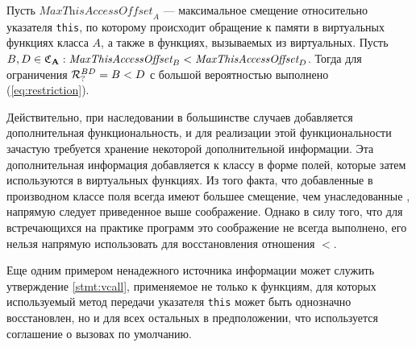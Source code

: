 Пусть $\textit{MaxThisAccessOffset}_A$ --- максимальное смещение относительно указателя \lstinline{this}, по которому происходит обращение к памяти в виртуальных функциях класса $A$, а также в функциях, вызываемых из виртуальных. Пусть $B, D \in \mathfrak{C}_{\mathbf{A}}: \textit{MaxThisAccessOffset}_B < \textit{MaxThisAccessOffset}_D$. Тогда для ограничения $\mathcal{R}_?^{BD} = B < D$ с большой вероятностью выполнено (\ref{eq:restriction}).

Действительно, при наследовании в большинстве случаев добавляется дополнительная функциональность, и для реализации этой функциональности зачастую требуется хранение некоторой дополнительной информации. Эта дополнительная информация добавляется к классу в форме полей, которые затем используются в виртуальных функциях. Из того факта, что добавленные в производном классе поля всегда имеют большее смещение, чем унаследованные \cite{gray94, gccabi}, напрямую следует приведенное выше соображение. Однако в силу того, что для встречающихся на практике программ это соображение не всегда выполнено, его нельзя напрямую использовать для восстановления отношения $<$.

Еще одним примером ненадежного источника информации может служить утверждение \ref{stmt:vcall}, применяемое не только к функциям, для которых используемый метод передачи указателя \lstinline{this} может быть однозначно восстановлен, но и для всех остальных в предположении, что используется соглашение о вызовах по умолчанию.





























